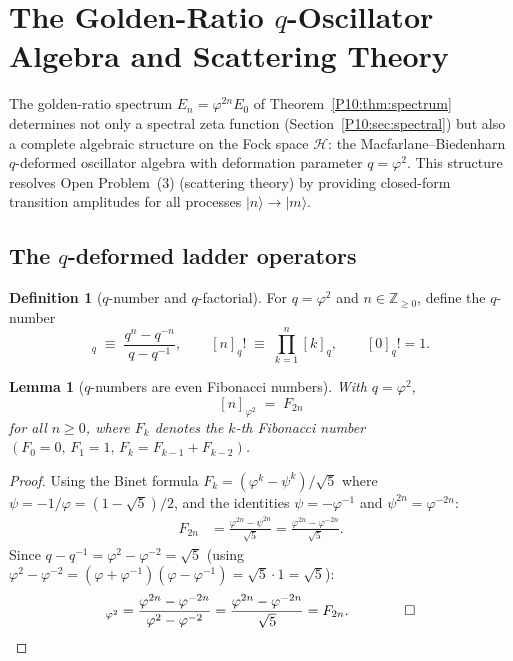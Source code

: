 \documentclass[11pt,a4paper]{article}
\newtheorem{lemma}[theorem]{Lemma}
\theoremstyle{definition}
\newtheorem{definition}[theorem]{Definition}
\theoremstyle{remark}
\newcommand{\vp}{\varphi}
\newcommand{\ZZ}{\mathbb{Z}}
\newcommand{\Hil}{\mathcal{H}}
\begin{document}
\section{The Golden-Ratio $q$-Oscillator Algebra and Scattering Theory}
\label{P10:sec:qalgebra}

The golden-ratio spectrum $E_n = \vp^{2n}E_0$ of Theorem~\ref{P10:thm:spectrum}
determines not only a spectral zeta function (Section~\ref{P10:sec:spectral})
but also a complete algebraic structure on the Fock space $\Hil$: the
Macfarlane--Biedenharn $q$-deformed oscillator algebra with deformation
parameter $q = \vp^2$.
This structure resolves Open Problem~(3) (scattering theory) by providing
closed-form transition amplitudes for all processes $|n\rangle\to|m\rangle$.

\subsection{The $q$-deformed ladder operators}

\begin{definition}[$q$-number and $q$-factorial]
\label{P10:def:q_numbers}
For $q = \vp^2$ and $n\in\ZZ_{\geq0}$, define the $q$-number
\begin{equation}
  [n]_q \;\equiv\; \frac{q^n - q^{-n}}{q - q^{-1}},
  \qquad
  [n]_q! \;\equiv\; \prod_{k=1}^n [k]_q,
  \qquad [0]_q! = 1.
  \label{P10:eq:q_numbers}
\end{equation}
\end{definition}

\begin{lemma}[$q$-numbers are even Fibonacci numbers]
\label{P10:lem:fibonacci}
With $q = \vp^2$,
\begin{equation}
  \boxed{[n]_{\vp^2} \;=\; F_{2n}}
  \label{P10:eq:fibonacci}
\end{equation}
for all $n\geq0$, where $F_k$ denotes the $k$-th Fibonacci number
$(F_0=0,\,F_1=1,\,F_k = F_{k-1}+F_{k-2})$.
\end{lemma}

\begin{proof}
Using the Binet formula $F_k = (\vp^k - \psi^k)/\sqrt{5}$ where
$\psi = -1/\vp = (1-\sqrt{5})/2$, and the identities
$\psi = -\vp^{-1}$ and $\psi^{2n} = \vp^{-2n}$:
\begin{align}
  F_{2n}
  &= \frac{\vp^{2n} - \psi^{2n}}{\sqrt{5}}
   = \frac{\vp^{2n} - \vp^{-2n}}{\sqrt{5}}.
  \label{P10:eq:binet_even}
\end{align}
Since $q - q^{-1} = \vp^2 - \vp^{-2} = \sqrt{5}$
(using $\vp^2 - \vp^{-2} = (\vp+\vp^{-1})(\vp-\vp^{-1}) = \sqrt{5}\cdot 1
= \sqrt{5}$):
\begin{equation}
  [n]_{\vp^2} = \frac{\vp^{2n}-\vp^{-2n}}{\vp^2-\vp^{-2}}
              = \frac{\vp^{2n}-\vp^{-2n}}{\sqrt{5}}
              = F_{2n}. \qquad\qed
\end{equation}
\end{proof}
\end{document}
